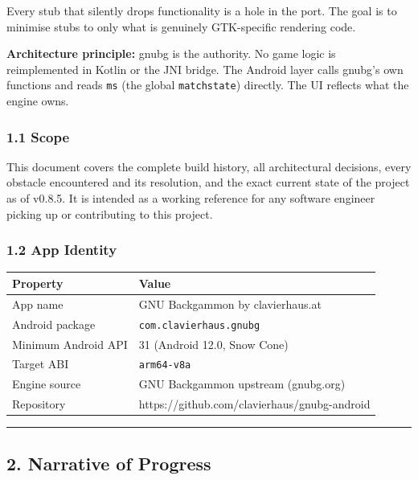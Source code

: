 \documentclass[11pt,a4paper]{article}
\begin{document}
Every stub that silently drops functionality is a hole in the port. The
goal is to minimise stubs to only what is genuinely GTK-specific
rendering code.

\textbf{Architecture principle:} gnubg is the authority. No game logic
is reimplemented in Kotlin or the JNI bridge. The Android layer calls
gnubg's own functions and reads \texttt{ms} (the global \texttt{matchstate})
directly. The UI reflects what the engine owns.

\subsubsection{1.1 Scope}\label{scope}

This document covers the complete build history, all architectural
decisions, every obstacle encountered and its resolution, and the exact
current state of the project as of v0.8.5. It is intended as a working
reference for any software engineer picking up or contributing to this
project.

\subsubsection{1.2 App Identity}\label{app-identity}

\begin{longtable}[]{@{}ll@{}}
\toprule\noalign{}
Property & Value \\
\midrule\noalign{}
\endhead
\bottomrule\noalign{}
\endlastfoot
App name & GNU Backgammon by clavierhaus.at \\
Android package & \texttt{com.clavierhaus.gnubg} \\
Minimum Android API & 31 (Android 12.0, Snow Cone) \\
Target ABI & \texttt{arm64-v8a} \\
Engine source & GNU Backgammon upstream (gnubg.org) \\
Repository & https://github.com/clavierhaus/gnubg-android \\
\end{longtable}

\begin{center}\rule{0.5\linewidth}{0.5pt}\end{center}

\subsection{2. Narrative of Progress}\label{narrative-of-progress}
\end{document}
